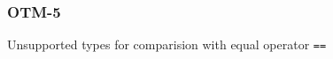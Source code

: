 \subsubsection{OTM-5}\label{sec:error_code_otm_5}

Unsupported types for comparision with equal operator \texttt{==}

